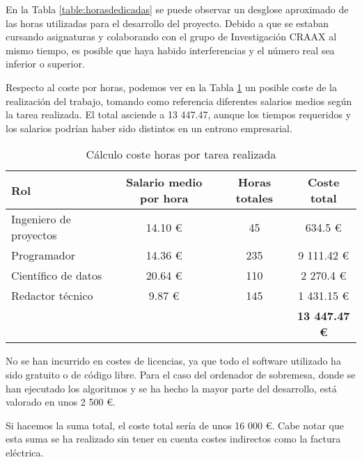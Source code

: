En la Tabla \ref{table:horasdedicadas} se puede observar un desglose aproximado de las horas utilizadas para el desarrollo del proyecto. Debido a que se estaban cursando asignaturas y colaborando con el grupo de Investigación CRAAX al mismo tiempo, es posible que haya habido interferencias y el número real sea inferior o superior. 

Respecto al coste por horas, podemos ver en la Tabla \ref{table:salarios} un posible coste de la realización del trabajo, tomando como referencia diferentes salarios medios según la tarea realizada. El total asciende a 13 447.47, aunque los tiempos requeridos y los salarios podrían haber sido distintos en un entrono empresarial.

\begin{table}[H]
  \centering
  \begin{tabular}{|l | c c c |}
      \hline
      \rowcolor{lightgray} \textbf{Rol} & \textbf{Salario medio por hora}            & \textbf{Horas totales} & \textbf{Coste total} \\ \hline
      Ingeniero de proyectos            & 14.10 € \cite{salarioingenierodeproyectos} &  45                    &    634.5  €          \\
      Programador                       & 14.36 € \cite{salarioprogramador}          & 235                    &  9 111.42 €          \\
      Científico de datos               & 20.64 € \cite{salariodatasci}              & 110                    &  2 270.4  €          \\
      Redactor técnico                  &  9.87 € \cite{salarioredactor}             & 145                    &  1 431.15 €          \\ \hline
      \rowcolor{lightgray}              &                                           &                        & \textbf{13 447.47 €}  \\
      \hline
  \end{tabular}
  \caption{Cálculo coste horas por tarea realizada}
  \label{table:salarios}
\end{table}

No se han incurrido en costes de licencias, ya que todo el software utilizado ha sido gratuito o de código libre. Para el caso del ordenador de sobremesa, donde se han ejecutado los algoritmos y se ha hecho la mayor parte del desarrollo, está valorado en unos 2 500 €.

Si hacemos la suma total, el coste total sería de unos 16 000 €. Cabe notar que esta suma se ha realizado sin tener en cuenta costes indirectos como la factura eléctrica.

